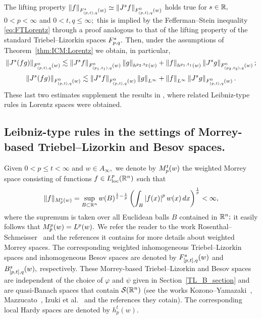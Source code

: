 The lifting property $ \norm{f}{\itl{(p,t)}{s}{q}(w)}\simeq\norm{J^s f}{\itl{(p,t)}{0}{q}(w)}$ holds true for $s \in \re,$ $0<p<\infty$ and  $0<t, q\le \infty;$ this is implied by the Fefferman--Stein inequality \eqref{eq:FTLorentz} through a proof analogous to that of the  lifting property of the standard Triebel--Lizorkin spaces $\itl{p}{s}{q}.$
Then, under the assumptions of Theorem~\ref{thm:ICM:Lorentz}  we obtain, in particular,
\begin{equation*}
\norm{J^s (fg)}{\itl{(p,t)}{0}{q}(w)} \lesssim \norm{J^s f}{\itl{(p_1,t_1)}{0}{q}(w)} \norm{g}{h^{p_2,t_2}(w)} +  \norm{f}{h^{p_1,t_1}(w)}   \norm{J^sg}{\itl{(p_2,t_2)}{0}{q}(w)};
\end{equation*}
\begin{equation*}
\norm{J^s(fg)}{\itlw{(p,t)}{0}{q}{w}} \lesssim \norm{J^sf}{\itlw{(p,t)}{0}{q}{w}} \norm{g}{L^\infty} +  \norm{f}{L^\infty}   \norm{J^s g}{\itlw{(p,t)}{0}{q}{w}}.
\end{equation*}
These last two estimates supplement the results in \cite[Theorem 6.1]{MR3513582}, where related Leibniz-type rules in Lorentz spaces were obtained.




 
 
 \subsection{Leibniz-type rules in the settings of Morrey-based Triebel--Lizorkin and Besov spaces.}

Given $0<p\le t<\infty$ and $w\in A_\infty,$  we denote by $\mow{p}{t}{w}$ the weighted Morrey space consisting of functions $f\in L^p_{\text{loc}}(\rn)$  such that
\[
\|f\|_{\mow{p}{t}{w}}=\sup_{B\subset \rn}w(B)^{\frac{1}{t}-\frac{1}{p}}\left( \int_B\abs{f(x)}^pw(x)\dx\right)^\frac{1}{p}<\infty,
\]
where the supremum is taken over all Euclidean balls $B$ contained in $\rn;$
 it easily  follows that $\mow{p}{p}{w}=\lebw{p}{w}.$  We refer the reader to the work Rosenthal--Schmeisser~\cite{MR3538648} and the  references it contains for more details about weighted Morrey spaces. The corresponding weighted inhomogeneous Triebel--Lizorkin spaces and inhomogeneous Besov spaces  are denoted by $\itlw{[p,t]}{s}{q}{w}$ and   $\ibesw{[p,t]}{s}{q}{w},$ respectively. These Morrey-based Triebel--Lizorkin and Besov  spaces are independent of the choice of $\varphi$ and $\psi$ given in  Section~\ref{TL_B_section} and are quasi-Banach spaces that contain $\sw$ (see the works Kozono--Yamazaki~\cite{MR1274547}, Mazzucato~\cite{MR1946395}, Izuki et al.~\cite{MR2792058} and the references they cotain). The corresponding local Hardy spaces are denoted by $h^t_p(w).$
 

